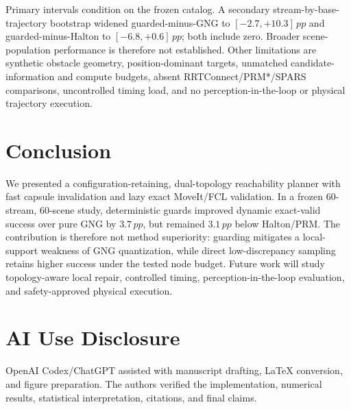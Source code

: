 \documentclass[letterpaper,10pt,conference]{ieeeconf}
\newcommand{\pp}{\,pp}
\begin{document}
Primary intervals condition on the frozen catalog. A secondary stream-by-base-trajectory bootstrap widened guarded-minus-GNG to $[-2.7,+10.3]\pp$ and guarded-minus-Halton to $[-6.8,+0.6]\pp$; both include zero. Broader scene-population performance is therefore not established. Other limitations are synthetic obstacle geometry, position-dominant targets, unmatched candidate-information and compute budgets, absent RRTConnect/PRM*/SPARS comparisons, uncontrolled timing load, and no perception-in-the-loop or physical trajectory execution.

\section{Conclusion}
We presented a configuration-retaining, dual-topology reachability planner with fast capsule invalidation and lazy exact MoveIt/FCL validation. In a frozen 60-stream, 60-scene study, deterministic guards improved dynamic exact-valid success over pure GNG by $3.7\pp$, but remained $3.1\pp$ below Halton/PRM. The contribution is therefore not method superiority: guarding mitigates a local-support weakness of GNG quantization, while direct low-discrepancy sampling retains higher success under the tested node budget. Future work will study topology-aware local repair, controlled timing, perception-in-the-loop evaluation, and safety-approved physical execution.

\section*{AI Use Disclosure}
OpenAI Codex/ChatGPT assisted with manuscript drafting, LaTeX conversion, and figure preparation. The authors verified the implementation, numerical results, statistical interpretation, citations, and final claims.



\end{document}
